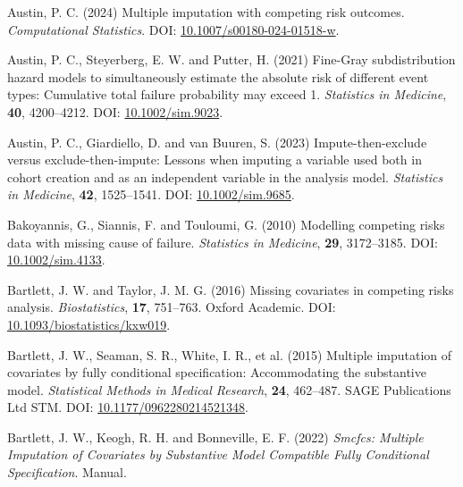 \documentclass[
  letterpaper,
  DIV=11,
  numbers=noendperiod]{scrreprt}
\newlength{\cslhangindent}
\newenvironment{CSLReferences}[2] %
 {\begin{list}{}{%
  \setlength{\itemindent}{0pt}
  \setlength{\leftmargin}{0pt}
  \setlength{\parsep}{0pt}
  \ifodd #1
   \setlength{\leftmargin}{\cslhangindent}
   \setlength{\itemindent}{-1\cslhangindent}
  \fi
  \setlength{\itemsep}{#2\baselineskip}}}
 {\end{list}}
\begin{document}
\begin{CSLReferences}{1}{1}
Austin, P. C. (2024) Multiple imputation with competing risk outcomes.
\emph{Computational Statistics}. DOI:
\href{https://doi.org/10.1007/s00180-024-01518-w}{10.1007/s00180-024-01518-w}.

Austin, P. C., Steyerberg, E. W. and Putter, H. (2021) Fine-{Gray}
subdistribution hazard models to simultaneously estimate the absolute
risk of different event types: {Cumulative} total failure probability
may exceed 1. \emph{Statistics in Medicine}, \textbf{40}, 4200--4212.
DOI: \href{https://doi.org/10.1002/sim.9023}{10.1002/sim.9023}.

Austin, P. C., Giardiello, D. and van Buuren, S. (2023)
Impute-then-exclude versus exclude-then-impute: {Lessons} when imputing
a variable used both in cohort creation and as an independent variable
in the analysis model. \emph{Statistics in Medicine}, \textbf{42},
1525--1541. DOI:
\href{https://doi.org/10.1002/sim.9685}{10.1002/sim.9685}.

Bakoyannis, G., Siannis, F. and Touloumi, G. (2010) Modelling competing
risks data with missing cause of failure. \emph{Statistics in Medicine},
\textbf{29}, 3172--3185. DOI:
\href{https://doi.org/10.1002/sim.4133}{10.1002/sim.4133}.

Bartlett, J. W. and Taylor, J. M. G. (2016) Missing covariates in
competing risks analysis. \emph{Biostatistics}, \textbf{17}, 751--763.
Oxford Academic. DOI:
\href{https://doi.org/10.1093/biostatistics/kxw019}{10.1093/biostatistics/kxw019}.

Bartlett, J. W., Seaman, S. R., White, I. R., et al. (2015) Multiple
imputation of covariates by fully conditional specification:
{Accommodating} the substantive model. \emph{Statistical Methods in
Medical Research}, \textbf{24}, 462--487. SAGE Publications Ltd STM.
DOI:
\href{https://doi.org/10.1177/0962280214521348}{10.1177/0962280214521348}.

Bartlett, J. W., Keogh, R. H. and Bonneville, E. F. (2022) \emph{Smcfcs:
{Multiple} Imputation of Covariates by Substantive Model Compatible
Fully Conditional Specification}. Manual.


\end{CSLReferences}
\end{document}
